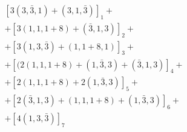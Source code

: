 \begin{equation}
\begin{array}{l}
[3(3,\bar{3}, 1) + (3, 1, \bar{3})]_1 + \\

+ [3(1, 1, 1+8) + (\bar{3}, 1, 3)]_2 + \\

+ [3(1, 3, \bar{3}) + (1, 1 + 8, 1)]_3 + \\

+ [(2(1, 1, 1+8) + (1, \bar{3}, 3) + (\bar{3}, 1, 3)]_4 + \\

+ [2(1, 1, 1 + 8) + 2 (1, \bar{3}, 3)]_5 + \\

+ [2(\bar{3}, 1, 3) + (1, 1, 1 + 8) + (1, \bar{3}, 3)]_6 + \\

+ [4(1, 3, \bar{3})]_7
\end{array}
\end{equation}

